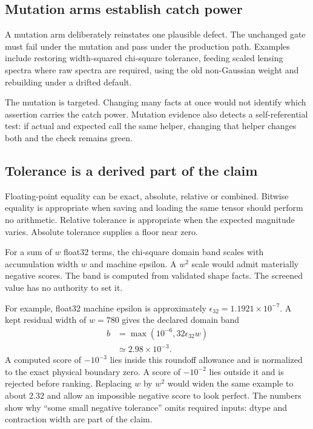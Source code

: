 \documentclass[10pt,aps,prd,twocolumn,nofootinbib]{revtex4-2}
\begin{document}
\subsection{Mutation arms establish catch power}

A mutation arm deliberately reinstates one plausible defect.  The unchanged
gate must fail under the mutation and pass under the production path.
Examples include restoring width-squared chi-square tolerance, feeding scaled
lensing spectra where raw spectra are required, using the old non-Gaussian
weight and rebuilding under a drifted default.

The mutation is targeted.  Changing many facts at once would not identify
which assertion carries the catch power.  Mutation evidence also detects a
self-referential test: if actual and expected call the same helper, changing
that helper changes both and the check remains green.

\subsection{Tolerance is a derived part of the claim}

Floating-point equality can be exact, absolute, relative or combined.
Bitwise equality is appropriate when saving and loading the same tensor
should perform no arithmetic.  Relative tolerance is appropriate when the
expected magnitude varies.  Absolute tolerance supplies a floor near zero.

For a sum of \(w\) float32 terms, the chi-square domain band scales with
accumulation width \(w\) and machine epsilon.  A \(w^2\) scale would admit
materially negative scores.  The band is computed
from validated shape facts.  The screened value has no authority to set it.

For example, float32 machine epsilon is approximately
\(\epsilon_{32}=1.1921\times10^{-7}\).  A kept residual width of $w=780$
gives the declared domain band
\begin{align*}
 b&=\max(10^{-6},32\epsilon_{32}w)\\
  &\simeq 2.98\times10^{-3}.
\end{align*}
A computed score of $-10^{-3}$ lies inside this roundoff allowance and is
normalized to the exact physical boundary zero.  A score of $-10^{-2}$
lies outside it and is rejected before ranking.  Replacing $w$ by $w^2$
would widen the same example to about $2.32$ and allow an impossible negative
score to look perfect.  The numbers show why ``some small negative
tolerance'' omits required inputs: dtype and contraction width are part of the
claim.
\end{document}
